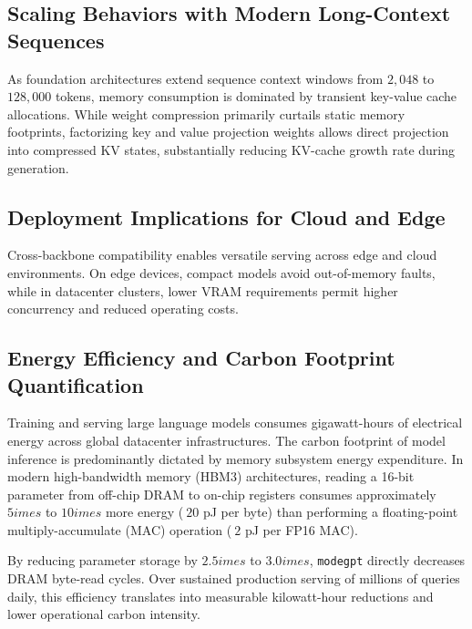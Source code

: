 \subsection{Scaling Behaviors with Modern Long-Context Sequences}
As foundation architectures extend sequence context windows from $2{,}048$ to $128{,}000$ tokens, memory consumption is dominated by transient key-value cache allocations. While weight compression primarily curtails static memory footprints, factorizing key and value projection weights allows direct projection into compressed KV states, substantially reducing KV-cache growth rate during generation.

\subsection{Deployment Implications for Cloud and Edge}
Cross-backbone compatibility enables versatile serving across edge and cloud environments. On edge devices, compact models avoid out-of-memory faults, while in datacenter clusters, lower VRAM requirements permit higher concurrency and reduced operating costs.

\subsection{Energy Efficiency and Carbon Footprint Quantification}
Training and serving large language models consumes gigawatt-hours of electrical energy across global datacenter infrastructures. The carbon footprint of model inference is predominantly dictated by memory subsystem energy expenditure. In modern high-bandwidth memory (HBM3) architectures, reading a 16-bit parameter from off-chip DRAM to on-chip registers consumes approximately $5	imes$ to $10	imes$ more energy ($~20$ pJ per byte) than performing a floating-point multiply-accumulate (MAC) operation ($~2$ pJ per FP16 MAC).

By reducing parameter storage by $2.5	imes$ to $3.0	imes$, \texttt{modegpt} directly decreases DRAM byte-read cycles. Over sustained production serving of millions of queries daily, this efficiency translates into measurable kilowatt-hour reductions and lower operational carbon intensity.
